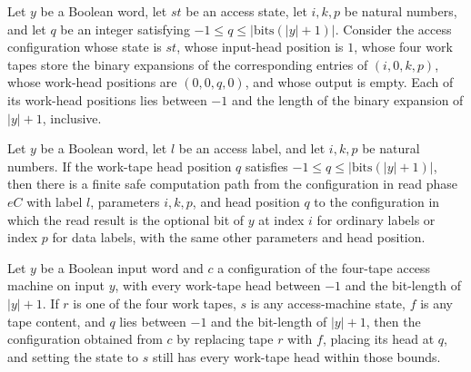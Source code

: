 \begin{lemma}
\label{Complexity.LogProg.accessCfg_safe}
\leanok
{}
Let $y$ be a Boolean word, let $st$ be an access state, let $i,k,p$ be natural numbers,
and let $q$ be an integer satisfying $-1\le q\le |\mathrm{bits}(|y|+1)|$. Consider the
access configuration whose state is $st$, whose input-head position is $1$, whose four
work tapes store the binary expansions of the corresponding entries of $(i,0,k,p)$,
whose work-head positions are $(0,0,q,0)$, and whose output is empty. Each of its
work-head positions lies between $-1$ and the length of the binary expansion of $|y|+1$,
inclusive.
\end{lemma}

\begin{lemma}
\label{Complexity.LogProg.access_read}
\leanok
{}
Let $y$ be a Boolean word, let $l$ be an access label, and let $i,k,p$ be natural
numbers. If the work-tape head position $q$ satisfies $-1\le q\le
|\mathrm{bits}(|y|+1)|$, then there is a finite safe computation path from the
configuration in read phase $eC$ with label $l$, parameters $i,k,p$, and head position
$q$ to the configuration in which the read result is the optional bit of $y$ at index
$i$ for ordinary labels or index $p$ for data labels, with the same other parameters and
head position.
\end{lemma}

\begin{lemma}
\label{Complexity.LogProg.access_frame}
\leanok
{}
Let $y$ be a Boolean input word and $c$ a configuration of the four-tape access machine
on input $y$, with every work-tape head between $-1$ and the bit-length of $|y|+1$. If
$r$ is one of the four work tapes, $s$ is any access-machine state, $f$ is any tape
content, and $q$ lies between $-1$ and the bit-length of $|y|+1$, then the configuration
obtained from $c$ by replacing tape $r$ with $f$, placing its head at $q$, and setting
the state to $s$ still has every work-tape head within those bounds.
\end{lemma}

